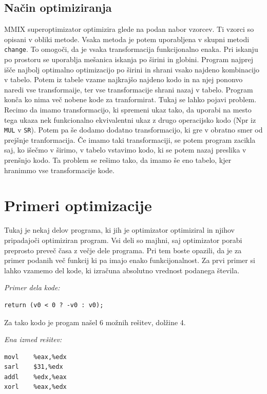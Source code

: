 \documentclass[a4paper, 12pt]{book}
\begin{document}
\subsection{Način optimiziranja}

MMIX superoptimizator optimizira glede na podan nabor vzorcev. Ti vzorci so opisani v obliki metode. Vsaka metoda je potem uporabljena v skupni metodi \texttt{change}. To omogoči, da je vsaka transformacija funkcijonalno enaka. Pri iskanju po prostoru se uporablja mešanica iskanja po širini in globini. Program najprej išče najbolj optimalno optimizacijo po širini in shrani vsako najdeno kombinacijo v tabelo. Potem iz tabele vzame najkrajšo najdeno kodo in na njej pononvo naredi vse transformaije, ter vse transformacije shrani nazaj v tabelo. Program konča ko nima več nobene kode za tranformirat. Tukaj se lahko pojavi problem. Recimo da imamo transformacijo, ki spremeni ukaz tako, da uporabi na mesto tega ukaza nek funkcionalno ekvivalentni ukaz z drugo operacijsko kodo (Npr iz \texttt{MUL} v \texttt{SR}). Potem pa še dodamo dodatno transformacijo, ki gre v obratno smer od prejšnje tranformacija. Če imamo taki transformaciji, se potem program zacikla saj, ko išečmo v širimo, v tabelo vstavimo kodo, ki se potem nazaj preslika v prenšnjo kodo. Ta problem se rešimo tako, da imamo še eno tabelo, kjer hranimmo vse transformacije kode.  

\section{Primeri optimizacije}
\label{priG}
Tukaj je nekaj delov programa, ki jih je optimizator optimiziral in njihov pripadajoči optimiziran program. Vsi deli so majhni, saj optimizator porabi preprosto preveč časa z večje dele programa. Pri tem boste opazili, da je za primer podanih več funkcij ki pa imajo enako funkcijonalnost. Za prvi primer si lahko vzamemo del kode, ki izračuna absolutno vrednost podanega števila.

\medskip

\noindent
{\it Primer dela kode:}
\begin{Verbatim}[baselinestretch=1]
return (v0 < 0 ? -v0 : v0);
\end{Verbatim}

Za tako kodo je progam našel 6 možnih rešitev, dolžine 4.

\medskip

\noindent
{\it Ena izmed rešitev:}
\begin{Verbatim}[baselinestretch=1]
movl    %eax,%edx    
sarl    $31,%edx
addl    %edx,%eax
xorl    %eax,%edx
\end{Verbatim}
\end{document}
